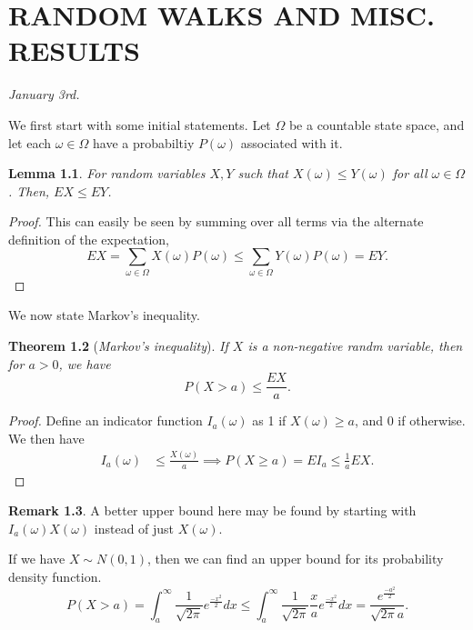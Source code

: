 \documentclass[15pt,a4paper]{book}
\newtheorem{theorem}{Theorem}[chapter]
\newtheorem{lemma}[theorem]{Lemma}
\theoremstyle{definition}
\newtheorem{remark}[theorem]{Remark}
\newcommand{\eax}[1]{\emph{#1}\index{#1}} %
\begin{document}


\chapter{RANDOM WALKS AND MISC. RESULTS}


\textit{January 3rd.}

We first start with some initial statements.
Let $\Omega$ be a countable state space, and let each $\omega \in \Omega$ have a probabiltiy $P(\omega)$ associated with it.

\begin{lemma}
    For random variables $X,Y$ such that $X(\omega) \leq Y(\omega)$ for all $\omega \in \Omega$. Then, $EX \leq EY$.
\end{lemma}
\begin{proof}
    This can easily be seen by summing over all terms via the alternate definition of the expectation,
    \begin{equation}
        EX = \sum_{\omega \in \Omega} X(\omega) P(\omega) \leq \sum_{\omega \in \Omega} Y(\omega) P(\omega) = EY.
    \end{equation}
\end{proof}

We now state Markov's inequality. 

\begin{theorem}[\eax{Markov's inequality}]
    If $X$ is a non-negative randm variable, then for $a > 0$, we have
    \begin{equation}
        P(X > a) \leq \frac{EX}{a}.
    \end{equation}
\end{theorem}
\begin{proof}
    Define an indicator function $I_{a}(\omega)$ as 1 if $X(\omega) \geq a$, and 0 if otherwise. We then have
    \begin{align}
        I_{a}(\omega) &\leq \frac{X(\omega)}{a} \implies P(X \geq a) = EI_{a} \leq \frac{1}{a} EX.
    \end{align}
\end{proof}
\begin{remark}
    A better upper bound here may be found by starting with $I_{a}(\omega)X(\omega)$ instead of just $X(\omega)$.
\end{remark}
If we have $X \sim N(0,1)$, then we can find an upper bound for its probability density function.
\begin{equation}
    P(X > a) = \int_{a}^{\infty} \frac{1}{\sqrt{2\pi}} e^{\frac{-x^{2}}{2}} dx \leq \int_{a}^{\infty} \frac{1}{\sqrt{2\pi}} \frac{x}{a} e^{\frac{-x^{2}}{2}} dx = \frac{e^{\frac{-a^{2}}{2}}}{\sqrt{2\pi}a}.
\end{equation}
\end{document}
